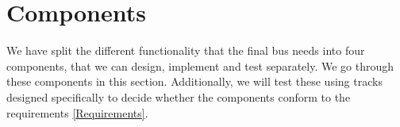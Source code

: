 \section{Components}
We have split the different functionality that the final bus needs into four components, that we can design, implement and test separately. We go through these components in this section. Additionally, we will test these using tracks designed specifically to decide whether the components conform to the requirements \ref{Requirements}.






